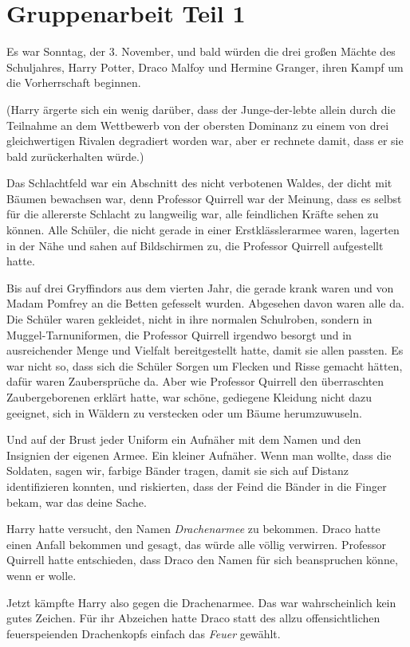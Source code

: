 \chapter{Gruppenarbeit Teil 1}

Es war Sonntag, der 3. November, und bald würden die drei großen Mächte des
Schuljahres, Harry Potter, Draco Malfoy und Hermine Granger, ihren Kampf um die
Vorherrschaft beginnen.

(Harry ärgerte sich ein wenig darüber, dass der Junge-der-lebte allein durch die
Teilnahme an dem Wettbewerb von der obersten Dominanz zu einem von drei
gleichwertigen Rivalen degradiert worden war, aber er rechnete damit, dass er
sie bald zurückerhalten würde.)

Das Schlachtfeld war ein Abschnitt des nicht verbotenen Waldes, der dicht mit
Bäumen bewachsen war, denn Professor Quirrell war der Meinung, dass es selbst
für die allererste Schlacht zu langweilig war, alle feindlichen Kräfte sehen zu
können. Alle Schüler, die nicht gerade in einer Erstklässlerarmee waren,
lagerten in der Nähe und sahen auf Bildschirmen zu, die Professor Quirrell
aufgestellt hatte.

Bis auf drei Gryffindors aus dem vierten Jahr, die gerade krank waren und von
Madam Pomfrey an die Betten gefesselt wurden. Abgesehen davon waren alle da. Die
Schüler waren gekleidet, nicht in ihre normalen Schulroben, sondern in
Muggel-Tarnuniformen, die Professor Quirrell irgendwo besorgt und in
ausreichender Menge und Vielfalt bereitgestellt hatte, damit sie allen passten.
Es war nicht so, dass sich die Schüler Sorgen um Flecken und Risse gemacht
hätten, dafür waren Zaubersprüche da. Aber wie Professor Quirrell den
überraschten Zaubergeborenen erklärt hatte, war schöne, gediegene Kleidung nicht
dazu geeignet, sich in Wäldern zu verstecken oder um Bäume herumzuwuseln.

Und auf der Brust jeder Uniform ein Aufnäher mit dem Namen und den Insignien der
eigenen Armee. Ein kleiner Aufnäher. Wenn man wollte, dass die Soldaten, sagen
wir, farbige Bänder tragen, damit sie sich auf Distanz identifizieren konnten,
und riskierten, dass der Feind die Bänder in die Finger bekam, war das deine
Sache.

Harry hatte versucht, den Namen \emph{Drachenarmee} zu bekommen. Draco hatte
einen Anfall bekommen und gesagt, das würde alle völlig verwirren. Professor
Quirrell hatte entschieden, dass Draco den Namen für sich beanspruchen könne,
wenn er wolle.

Jetzt kämpfte Harry also gegen die Drachenarmee. Das war wahrscheinlich kein
gutes Zeichen. Für ihr Abzeichen hatte Draco statt des allzu offensichtlichen
feuerspeienden Drachenkopfs einfach das \emph{Feuer} gewählt.

